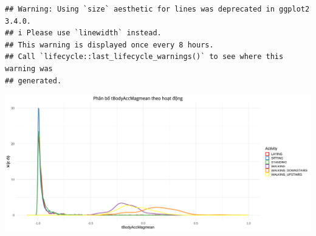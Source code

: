 \documentclass[
]{article}
\begin{document}
\begin{verbatim}
## Warning: Using `size` aesthetic for lines was deprecated in ggplot2 3.4.0.
## i Please use `linewidth` instead.
## This warning is displayed once every 8 hours.
## Call `lifecycle::last_lifecycle_warnings()` to see where this warning was
## generated.
\end{verbatim}

\includegraphics{report_files/figure-latex/unnamed-chunk-10-1.pdf}
\end{document}

